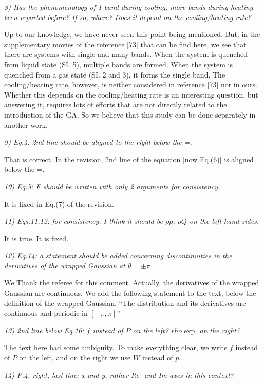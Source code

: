 \documentclass[a4paper,11pt]{letter}
\newcommand{\p}{p}
\newcommand{\w}{W}
\newcommand{\rf}[1]{\textit{\textcolor{hlcolor}{#1}}}
\begin{document}
\rf{8) Has the phenomenology of 1 band during cooling, more bands during heating been reported before? If so, where? Does it depend on the cooling/heating rate?}

Up to our knowledge, we have never seen this point being mentioned. But, in the supplementary movies of the reference [73] that can be find \href{http://journals.aps.org/prl/abstract/10.1103/PhysRevLett.114.068101}{here}, we see that there are systems with single and many bands. When the system is quenched from liquid state (SI. 5), multiple bands are formed. When the system is quenched from a gas state (SI. 2 and 3), it forms the single band. The cooling/heating rate, however, is neither considered in reference [73] nor in ours. Whether this depends on the cooling/heating rate is an interesting question, but answering it, requires lots of efforts that are not directly related to the introduction of the GA. So we believe that this study can be done separately in another work.

\rf{9) Eq.4: 2nd line should be aligned to the right below the =.}

That is correct. In the revision, 2nd line of the equation [now Eq.(6)] is aligned below the =.

\rf{10) Eq.5: F should be written with only 2 arguments for consistency.}

It is fixed in Eq.(7) of the revision.

\rf{11) Eqs.11,12: for consistency, I think it should be $\rho \p$, $\rho Q$ on the left-hand sides.}

It is true. It is fixed.

\rf{12) Eq.14: a statement should be added concerning discontinuities in the derivatives of the wrapped Gaussian at $\theta=\pm \pi$.}

We Thank the referee for this comment. Actually, the derivatives of the wrapped Gaussian are continuous. We add the following statement to the text, below the definition of the wrapped Gaussian. ``The distribution and its derivatives are continuous and periodic in $[-\pi,\pi]$''

\rf{13) 2nd line below Eq.16: $f$ instead of $P$ on the left? $rho \exp$ on the right?}

The text here had some ambiguity. To make everything clear, we write $f$ instead of $P$ on the left, and on the right we use $\w$ instead of $\p$.

\rf{14) P.4, right, last line: x and y, rather Re- and Im-axes in this context?}
\end{document}
